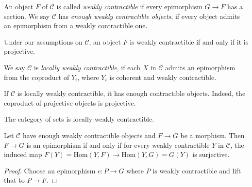 \begin{definition}
    An object $F$ of $\mathcal{C}$ is called \emph{weakly contractible} if every epimorphism
    $G \to F$ has a section. We say $\mathcal{C}$ has \emph{enough weakly contractible objects},
    if every object admits an epimorphism from a weakly contractible one.
    \label{def:weakly-contractible}
    \leanok
\end{definition}

\begin{remark}
    Under our assumptions on $\mathcal{C}$, an object $F$ is weakly contractible if and only
    if it is projective.
    \leanok
\end{remark}

\begin{definition}
    We say $\mathcal{C}$ is \emph{locally weakly contractible},
    if each $X$ in $\mathcal{C}$ admits an epimorphism from the coproduct of $Y_i$,
    where $Y_i$ is coherent and weakly contractible.
    \label{def:lwc}
\end{definition}

\begin{remark}
    If $\mathcal{C}$ is locally weakly contractible, it has enough contractible objects. Indeed,
    the coproduct of projective objects is projective.
\end{remark}

\begin{example}
    The category of sets is locally weakly contractible.
\end{example}

\begin{lemma}
    Let $\mathcal{C}$ have enough weakly contractible objects and $F \to G$ be a morphism.
    Then $F \to G$ is an epimorphism if and only if for every
    weakly contractible $Y$ in $\mathcal{C}$, the induced map
    $F(Y) = \mathrm{Hom}(Y, F) \to \mathrm{Hom}(Y, G) = G(Y)$ is
    surjective.
    \label{lemma:wc-epi-criterion}
    \leanok
\end{lemma}

\begin{proof}
    Choose an epimorphism $e \colon P \to G$ where $P$ is weakly contractible
    and lift that to $P \to F$.
    \leanok
\end{proof}

